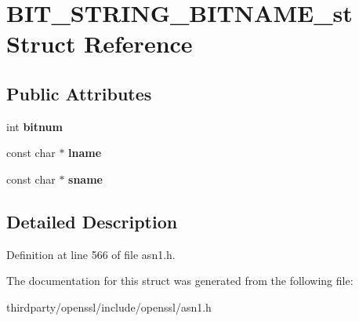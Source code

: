 \hypertarget{struct_b_i_t___s_t_r_i_n_g___b_i_t_n_a_m_e__st}{}\section{B\+I\+T\+\_\+\+S\+T\+R\+I\+N\+G\+\_\+\+B\+I\+T\+N\+A\+M\+E\+\_\+st Struct Reference}
\label{struct_b_i_t___s_t_r_i_n_g___b_i_t_n_a_m_e__st}
\subsection*{Public Attributes}
\begin{DoxyCompactItemize}
\item 
\mbox{\label{struct_b_i_t___s_t_r_i_n_g___b_i_t_n_a_m_e__st_adbddb7cc8584fbb8ae3803eb6d54eec8}} 
int {\bfseries bitnum}
\item 
\mbox{\label{struct_b_i_t___s_t_r_i_n_g___b_i_t_n_a_m_e__st_a7b6403eb8f9e092395526bd981150531}} 
const char $\ast$ {\bfseries lname}
\item 
\mbox{\label{struct_b_i_t___s_t_r_i_n_g___b_i_t_n_a_m_e__st_a78a12a66f7da99aeb5e7a3b07cc411cf}} 
const char $\ast$ {\bfseries sname}
\end{DoxyCompactItemize}


\subsection{Detailed Description}


Definition at line 566 of file asn1.\+h.



The documentation for this struct was generated from the following file\+:\begin{DoxyCompactItemize}
\item 
thirdparty/openssl/include/openssl/asn1.\+h\end{DoxyCompactItemize}
